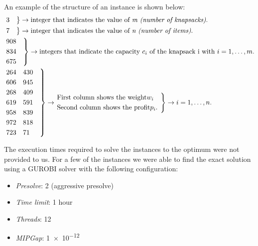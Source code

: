 An example of the structure of an instance is shown below:
\[
    \begin{split}
        &\begin{rcases*}
             3 \quad
        \end{rcases*}
        \rightarrow \text{integer that indicates the value of \textit{m (number of knapsacks)}.}\\
        &\begin{rcases*}
             7 \quad
        \end{rcases*}
        \rightarrow \text{integer that indicates the value of \textit{n (number of items)}.}\\
        &\begin{rcases*}
             908 \quad\\
             834\\
             675\\
        \end{rcases*}
        \rightarrow \text{integers that indicate the capacity } c_{i} \text{ of the knapsack i with }
        \space i=1,\dots,m.\\
        &\begin{rcases*}
             264    \quad 430 \quad\\
             606 \quad    945\\
             268 \quad    409\\
             619 \quad    591\\
             958 \quad    839\\
             972 \quad    818\\
             723 \quad    71\\
        \end{rcases*}
        \rightarrow
        \begin{rcases*}
            \text{First column shows the weight} w_{i} \quad \\
            \text{Second column shows the profit} p_{i}.
        \end{rcases*}
        \rightarrow
        \space i=1,\dots,n.
    \end{split}
\]

The execution times required to solve the instances to the optimum were not provided to us.
For a few of the instances we were able to find the exact solution
using a GUROBI solver with the following configuration:

\begin{itemize}
    \item \textit{Presolve}: 2 (aggressive presolve)
    \item \textit{Time limit}: 1 hour
    \item \textit{Threads}: 12
    \item \textit{MIPGap}: \num{1e-12}
\end{itemize}

